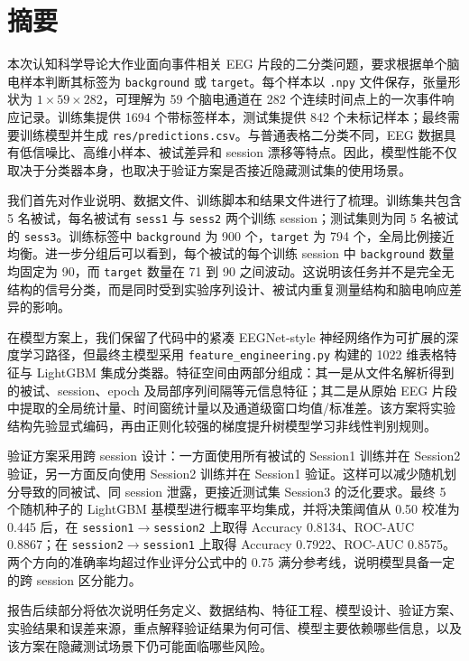 \chapter{摘要}

本次认知科学导论大作业面向事件相关 EEG 片段的二分类问题，要求根据单个脑电样本判断其标签为 \texttt{background} 或 \texttt{target}。每个样本以 \texttt{.npy} 文件保存，张量形状为 $1\times59\times282$，可理解为 59 个脑电通道在 282 个连续时间点上的一次事件响应记录。训练集提供 1694 个带标签样本，测试集提供 842 个未标记样本；最终需要训练模型并生成 \texttt{res/predictions.csv}。与普通表格二分类不同，EEG 数据具有低信噪比、高维小样本、被试差异和 session 漂移等特点。因此，模型性能不仅取决于分类器本身，也取决于验证方案是否接近隐藏测试集的使用场景。

我们首先对作业说明、数据文件、训练脚本和结果文件进行了梳理。训练集共包含 5 名被试，每名被试有 \texttt{sess1} 与 \texttt{sess2} 两个训练 session；测试集则为同 5 名被试的 \texttt{sess3}。训练标签中 \texttt{background} 为 900 个，\texttt{target} 为 794 个，全局比例接近均衡。进一步分组后可以看到，每个被试的每个训练 session 中 \texttt{background} 数量均固定为 90，而 \texttt{target} 数量在 71 到 90 之间波动。这说明该任务并不是完全无结构的信号分类，而是同时受到实验序列设计、被试内重复测量结构和脑电响应差异的影响。

在模型方案上，我们保留了代码中的紧凑 EEGNet-style 神经网络作为可扩展的深度学习路径，但最终主模型采用 \texttt{feature\_engineering.py} 构建的 1022 维表格特征与 LightGBM 集成分类器。特征空间由两部分组成：其一是从文件名解析得到的被试、session、epoch 及局部序列间隔等元信息特征；其二是从原始 EEG 片段中提取的全局统计量、时间窗统计量以及通道级窗口均值/标准差。该方案将实验结构先验显式编码，再由正则化较强的梯度提升树模型学习非线性判别规则。

验证方案采用跨 session 设计：一方面使用所有被试的 Session1 训练并在 Session2 验证，另一方面反向使用 Session2 训练并在 Session1 验证。这样可以减少随机划分导致的同被试、同 session 泄露，更接近测试集 Session3 的泛化要求。最终 5 个随机种子的 LightGBM 基模型进行概率平均集成，并将决策阈值从 0.50 校准为 0.445 后，在 \texttt{session1$\rightarrow$session2} 上取得 Accuracy 0.8134、ROC-AUC 0.8867；在 \texttt{session2$\rightarrow$session1} 上取得 Accuracy 0.7922、ROC-AUC 0.8575。两个方向的准确率均超过作业评分公式中的 0.75 满分参考线，说明模型具备一定的跨 session 区分能力。

报告后续部分将依次说明任务定义、数据结构、特征工程、模型设计、验证方案、实验结果和误差来源，重点解释验证结果为何可信、模型主要依赖哪些信息，以及该方案在隐藏测试场景下仍可能面临哪些风险。

